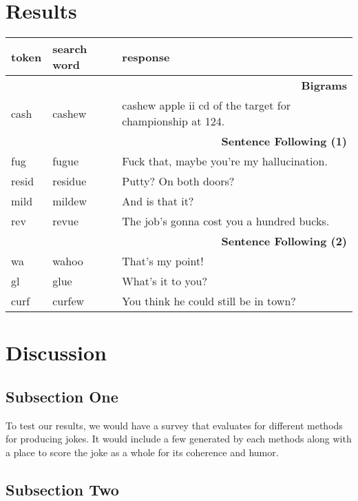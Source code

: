 \documentclass[twoside,twocolumn]{article}
\begin{document}
\section{Results}


\begin{center}
\begin{tabular}{lp{10mm}p{30mm}}
\toprule
token & search word & response\\
\midrule
\multicolumn{3}{r}{\textbf{Bigrams}} \\
\cmidrule(r){1-3}
cash & cashew & cashew apple ii cd of the target for championship at 124. \\
\midrule
\multicolumn{3}{r}{\textbf{Sentence Following (1)}} \\
\cmidrule(r){1-3}
fug & fugue & Fuck that, maybe you're my hallucination. \\
resid & residue & Putty? On both doors? \\
mild & mildew & And is that it? \\
rev & revue & The job's gonna cost you a hundred bucks. \\
\midrule
\multicolumn{3}{r}{\textbf{Sentence Following (2)}} \\
\cmidrule(r){1-3}
wa & wahoo & That's my point! \\
gl & glue & What's it to you? \\
curf & curfew & You think he could still be in town? \\
\bottomrule
\end{tabular}
\end{center}


\section{Discussion}

\subsection{Subsection One}

To test our results, we would have a survey that evaluates for different methods for producing jokes. It would include a few generated by each methods along with a place to score the joke as a whole for its coherence and humor.

\subsection{Subsection Two}
\end{document}
